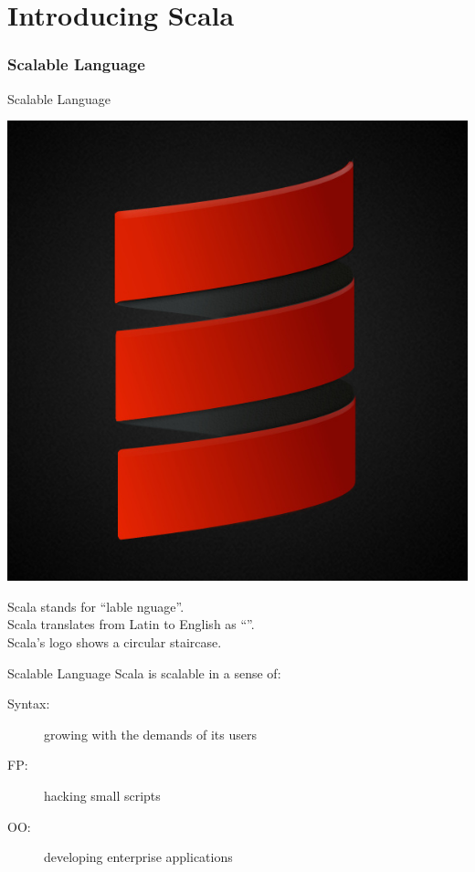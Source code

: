 \part[Introducing Scala]{Introducing Scala}
\section{Scalable Language}
\begin{frame}{Scalable Language}
\begin{center}
\includegraphics{resources/Scala.jpg}
\end{center}
\begin{center}
Scala stands for ``lable nguage''.\\
Scala translates from Latin to English as ``''.\\
Scala's logo shows a circular staircase.
\end{center}
\end{frame}

\begin{frame}{Scalable Language}
Scala is scalable in a sense of:
\begin{description}
  \item[Syntax:] growing with the demands of its users
  \item[FP:] hacking small scripts
  \item[OO:] developing enterprise applications
\end{description}
\end{frame}

